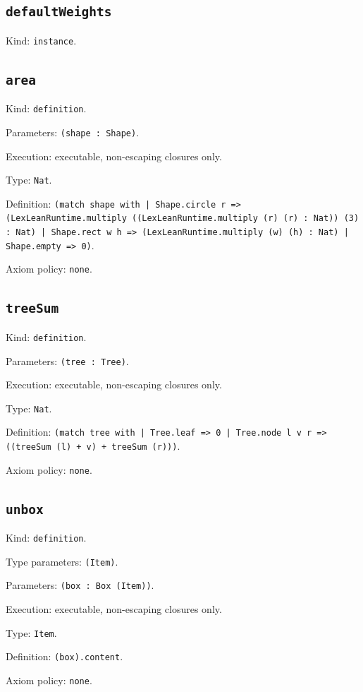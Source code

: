 \documentclass[11pt]{article}
\begin{document}
\subsection*{\texttt{defaultWeights}}
\noindent Kind: \texttt{instance}.\par
\subsection*{\texttt{area}}
\noindent Kind: \texttt{definition}.\par
\noindent Parameters: \texttt{(shape : Shape)}.\par
\noindent Execution: executable, non-escaping closures only.\par
\noindent Type: \texttt{Nat}.\par
\noindent Definition: \texttt{(match shape with | Shape.circle r => (LexLeanRuntime.multiply ((LexLeanRuntime.multiply (r) (r) : Nat)) (3) : Nat) | Shape.rect w h => (LexLeanRuntime.multiply (w) (h) : Nat) | Shape.empty => 0)}.\par
\noindent Axiom policy: \texttt{none}.\par
\subsection*{\texttt{treeSum}}
\noindent Kind: \texttt{definition}.\par
\noindent Parameters: \texttt{(tree : Tree)}.\par
\noindent Execution: executable, non-escaping closures only.\par
\noindent Type: \texttt{Nat}.\par
\noindent Definition: \texttt{(match tree with | Tree.leaf => 0 | Tree.node l v r => ((treeSum (l) + v) + treeSum (r)))}.\par
\noindent Axiom policy: \texttt{none}.\par
\subsection*{\texttt{unbox}}
\noindent Kind: \texttt{definition}.\par
\noindent Type parameters: \texttt{(Item)}.\par
\noindent Parameters: \texttt{(box : Box (Item))}.\par
\noindent Execution: executable, non-escaping closures only.\par
\noindent Type: \texttt{Item}.\par
\noindent Definition: \texttt{(box).content}.\par
\noindent Axiom policy: \texttt{none}.\par
\end{document}
